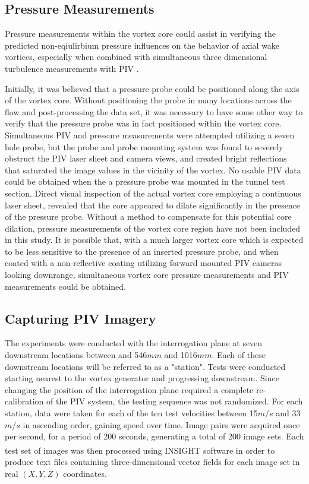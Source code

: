 \subsection{Pressure Measurements}

Pressure measurements within the vortex core could assist in verifying the 
predicted non-eqiulirbium pressure influences on the behavior of axial wake 
vortices, especially when combined with simultaneous three dimensional 
turbulence measurements with PIV \cite{ash2011}.


Initially, it was believed that a pressure probe could be positioned 
along the axis of the vortex core. Without positioning the probe in many 
locations across the flow and post-processing the data set, it was necessary to 
have some other way to verify that the pressure probe was in fact positioned 
within the vortex core. Simultaneous PIV and pressure measurements were 
attempted utilizing a seven hole probe, but the probe and probe mounting system 
was found to severely obstruct the PIV laser sheet and camera views, and 
created bright reflections that saturated the image values in the vicinity of 
the vortex. No usable PIV data could be obtained when the a pressure probe was 
mounted in the tunnel test section. Direct visual inspection of the actual 
vortex core employing a continuous laser sheet, revealed that the core appeared 
to dilate significantly in the presence of the pressure probe. Without a method 
to compensate for this potential core dilation, pressure measurements of the 
vortex core region have not been included in this study. It is possible that, 
with a much larger vortex core which is expected to be less 
sensitive to the presence of an inserted pressure probe, and when coated with 
a non-reflective coating utilizing forward mounted PIV cameras looking 
downrange, simultaneous vortex core pressure measurements and PIV measurements 
could be obtained.

\subsection{Capturing PIV Imagery}

The experiments were conducted with the interrogation plane at seven 
downstream  locations between and 546$mm$ and 1016$mm$. Each of these 
downstream locations will be referred to as a "station". Tests were conducted 
starting nearest to the vortex 
generator and progressing downstream. Since changing the position of the 
interrogation plane required a complete re-calibration of the PIV system, the 
testing sequence was not randomized. For each station, data were taken for each 
of 
the ten test velocities between 15$m/s$ and 33$m/s$ in ascending order, gaining 
speed over time. Image pairs were acquired once per second, for a period of 200 
seconds, generating a total of 200 image sets. Each test set of images was then 
processed using INSIGHT\textsuperscript{\textcopyright} software in 
order to produce text files containing three-dimensional vector fields for each 
image set in real $(X, Y, Z)$ coordinates.

